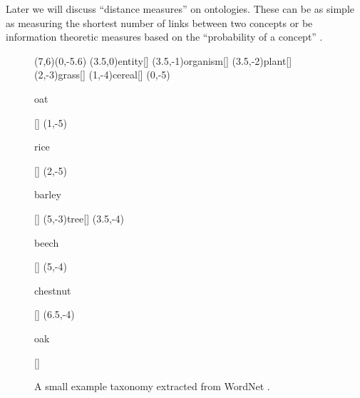 Later we will discuss ``distance measures'' on ontologies. These can be as simple as measuring the shortest number of links between two concepts \citep{Rada:89} or be information theoretic measures based on the ``probability of a concept'' \citep{Resnik:95,Jiang:97}.

\begin{figure}
\begin{center}
\begin{graph}(7,6)(0,-5.6)
(3.5,0){entity}[]
(3.5,-1){organism}[]
(3.5,-2){plant}[]
	(2,-3){grass}[]
	(1,-4){cereal}[]
		(0,-5){\rule[-0.5ex]{0pt}{2.1ex}oat}[]
		(1,-5){\rule[-0.5ex]{0pt}{2.1ex}rice}[]
		(2,-5){\rule[-0.5ex]{0pt}{2.1ex}barley}[]
	(5,-3){tree}[]
		(3.5,-4){\rule{0pt}{2ex}beech}[]
		(5,-4){\rule{0pt}{2ex}chestnut}[]
		(6.5,-4){\rule{0pt}{2ex}oak}[]



\end{graph}
\end{center}
\caption{A small example taxonomy extracted from WordNet \citep{Fellbaum:98}.}
\label{plant-taxonomy}
\end{figure}


%

